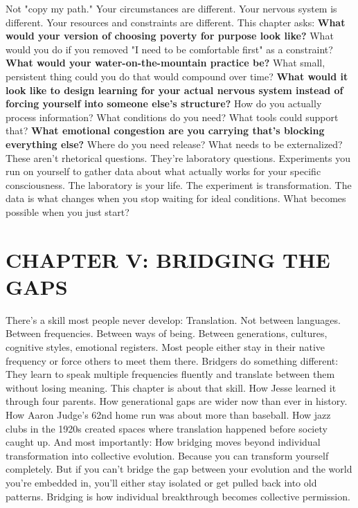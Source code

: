 \documentclass[12pt,openany]{book}
\begin{document}
Not "copy my path." Your circumstances are different. Your nervous system is different. Your resources and constraints are different.
This chapter asks:
\textbf{What would your version of choosing poverty for purpose look like?}
What would you do if you removed "I need to be comfortable first" as a constraint?
\textbf{What would your water-on-the-mountain practice be?}
What small, persistent thing could you do that would compound over time?
\textbf{What would it look like to design learning for your actual nervous system instead of forcing yourself into someone else's structure?}
How do you actually process information? What conditions do you need? What tools could support that?
\textbf{What emotional congestion are you carrying that's blocking everything else?}
Where do you need release? What needs to be externalized?
These aren't rhetorical questions. They're laboratory questions.
Experiments you run on yourself to gather data about what actually works for your specific consciousness.
The laboratory is your life. The experiment is transformation. The data is what changes when you stop waiting for ideal conditions.
What becomes possible when you just start?

\cleardoublepage

\chapter{CHAPTER V: BRIDGING THE GAPS}

There's a skill most people never develop:
Translation.
Not between languages. Between frequencies. Between ways of being. Between generations, cultures, cognitive styles, emotional registers.
Most people either stay in their native frequency or force others to meet them there.
Bridgers do something different: They learn to speak multiple frequencies fluently and translate between them without losing meaning.
This chapter is about that skill.
How Jesse learned it through four parents. How generational gaps are wider now than ever in history. How Aaron Judge's 62nd home run was about more than baseball. How jazz clubs in the 1920s created spaces where translation happened before society caught up.
And most importantly: How bridging moves beyond individual transformation into collective evolution.
Because you can transform yourself completely. But if you can't bridge the gap between your evolution and the world you're embedded in, you'll either stay isolated or get pulled back into old patterns.
Bridging is how individual breakthrough becomes collective permission.
\end{document}
